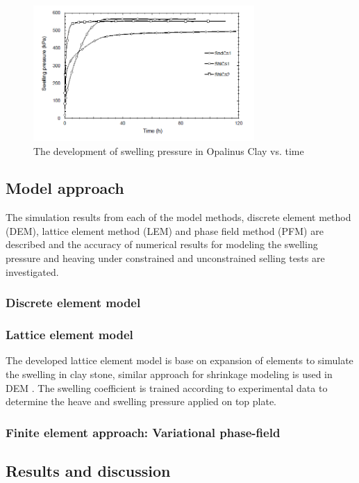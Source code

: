 \begin{figure}[!ht]
\centering
\includegraphics[width=0.75\textwidth]{figures/Amir_ME5_Swelling_Constrained.png}
\caption{The development of swelling pressure in Opalinus Clay vs. time \cite{Peronetal2009}}
\label{fig:Amir_ME5_Swelling_Constrained}
\end{figure}

\subsection{Model approach}

The simulation results from each of the model methods, discrete element method (DEM), lattice element method (LEM) and phase field method (PFM) are described and the accuracy of numerical results for modeling the swelling pressure and heaving under constrained and unconstrained selling tests are investigated.

\subsubsection*{Discrete element model}


\subsubsection*{Lattice element model}

The developed lattice element model is base on expansion of elements to simulate the swelling in clay stone, similar approach for shrinkage modeling is used in DEM \cite{Simaetal2013}. The swelling coefficient is trained according to experimental data to determine the heave and swelling pressure applied on top plate. 


\subsubsection*{Finite element approach: Variational phase-field}


\subsection{Results and discussion}